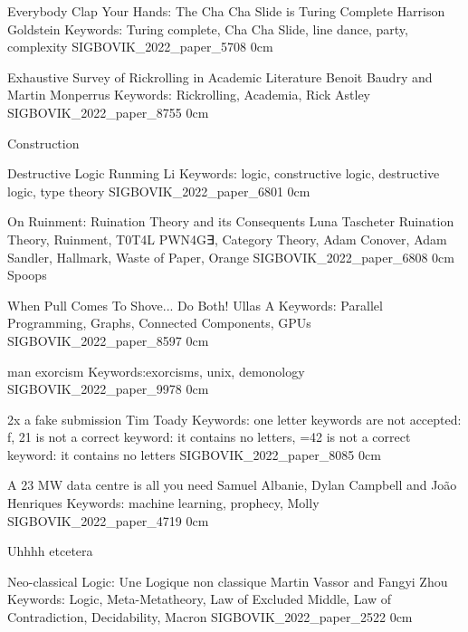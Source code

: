 \addpaper
    {Everybody Clap Your Hands: The Cha Cha Slide is Turing Complete}
    {Harrison Goldstein}
    {Keywords: Turing complete, Cha Cha Slide, line dance, party, complexity}
    {SIGBOVIK_2022_paper_5708}
    {0cm}
    {}



\addpaper
    {Exhaustive Survey of Rickrolling in Academic Literature}
    {Benoit Baudry and Martin Monperrus}
    {Keywords: Rickrolling, Academia, Rick Astley}
    {SIGBOVIK_2022_paper_8755}
    {0cm}
    {}

\addtrack
    {}{Construction}

\addpaper
    {Destructive Logic}
    {Runming Li}
    {Keywords: logic, constructive logic, destructive logic, type theory}
    {SIGBOVIK_2022_paper_6801}
    {0cm}
    {}

\addpaper
    {On Ruinment: Ruination Theory and its Consequents}
    {Luna Tascheter}
    {Ruination Theory, Ruinment, T0T4L PWN4G∃, Category Theory, Adam Conover, Adam Sandler, Hallmark, Waste of Paper, Orange}
    {SIGBOVIK_2022_paper_6808}
    {0cm}
    {}
\addtrack
    {}{Spoops}


\addpaper
    {When Pull Comes To Shove... Do Both!}
    {Ullas A}
    {Keywords: Parallel Programming, Graphs, Connected Components, GPUs}
    {SIGBOVIK_2022_paper_8597}
    {0cm}
    {}


\addpaper
    {man exorcism}
    {}
    {Keywords:exorcisms, unix, demonology}
    {SIGBOVIK_2022_paper_9978}
    {0cm}
    {}

\addpaper
    {2x a fake submission}
    {Tim Toady}
    {Keywords: one letter keywords are not accepted: f, 21 is not a correct keyword: it contains no letters, =42 is not a correct keyword: it contains no letters}
    {SIGBOVIK_2022_paper_8085}
    {0cm}
    {}


\addpaper
    {A 23 MW data centre is all you need}
    {Samuel Albanie, Dylan Campbell and João Henriques}
    {Keywords: machine learning, prophecy, Molly}
    {SIGBOVIK_2022_paper_4719}
    {0cm}
    {}

\addtrack
    {}{Uhhhh etcetera}



\addpaper
    {Neo-classical Logic: Une Logique non classique}
    {Martin Vassor and Fangyi Zhou}
    {Keywords: Logic, Meta-Metatheory, Law of Excluded Middle, Law of Contradiction, Decidability, Macron}
    {SIGBOVIK_2022_paper_2522}
    {0cm}
    {}


